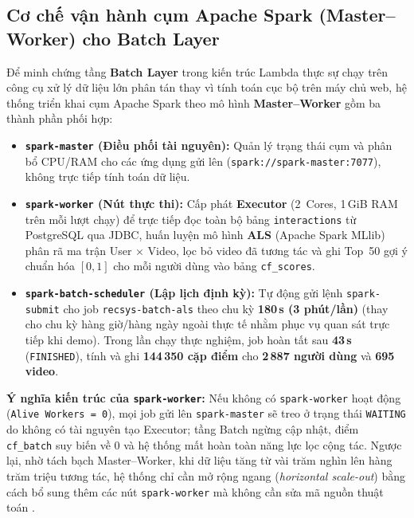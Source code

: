 \subsection*{Cơ chế vận hành cụm Apache Spark (Master--Worker) cho Batch Layer}

Để minh chứng tầng \textbf{Batch Layer} trong kiến trúc Lambda thực sự chạy trên công cụ xử lý dữ liệu lớn phân tán thay vì tính toán cục bộ trên máy chủ web, hệ thống triển khai cụm Apache Spark theo mô hình \textbf{Master--Worker} gồm ba thành phần phối hợp:

\begin{itemize}
  \item \textbf{\texttt{spark-master} (Điều phối tài nguyên):} Quản lý trạng thái cụm và phân bổ CPU/RAM cho các ứng dụng gửi lên (\texttt{spark://spark-master:7077}), không trực tiếp tính toán dữ liệu.
  \item \textbf{\texttt{spark-worker} (Nút thực thi):} Cấp phát \textbf{Executor} (2~Cores, 1\,GiB RAM trên mỗi lượt chạy) để trực tiếp đọc toàn bộ bảng \texttt{interactions} từ PostgreSQL qua JDBC, huấn luyện mô hình \textbf{ALS} (Apache Spark MLlib) phân rã ma trận User $\times$ Video, lọc bỏ video đã tương tác và ghi Top~50 gợi ý chuẩn hóa $[0, 1]$ cho mỗi người dùng vào bảng \texttt{cf\_scores}.
  \item \textbf{\texttt{spark-batch-scheduler} (Lập lịch định kỳ):} Tự động gửi lệnh \texttt{spark-submit} cho job \texttt{recsys-batch-als} theo chu kỳ \textbf{180\,s (3 phút/lần)} (thay cho chu kỳ hàng giờ/hàng ngày ngoài thực tế nhằm phục vụ quan sát trực tiếp khi demo). Trong lần chạy thực nghiệm, job hoàn tất sau \textbf{43\,s} (\texttt{FINISHED}), tính và ghi \textbf{144\,350 cặp điểm} cho \textbf{2\,887 người dùng} và \textbf{695 video}.
\end{itemize}

\noindent\textbf{Ý nghĩa kiến trúc của \texttt{spark-\allowbreak worker}:} Nếu không có \texttt{spark-\allowbreak worker} hoạt động (\texttt{Alive Workers = 0}), mọi job gửi lên \texttt{spark-master} sẽ treo ở trạng thái \texttt{WAITING} do không có tài nguyên tạo Executor; tầng Batch ngừng cập nhật, điểm \texttt{cf\_batch} suy biến về $0$ và hệ thống mất hoàn toàn năng lực lọc cộng tác. Ngược lại, nhờ tách bạch Master--Worker, khi dữ liệu tăng từ vài trăm nghìn lên hàng trăm triệu tương tác, hệ thống chỉ cần mở rộng ngang (\textit{horizontal scale-out}) bằng cách bổ sung thêm các nút \texttt{spark-\allowbreak worker} mà không cần sửa mã nguồn thuật toán .

